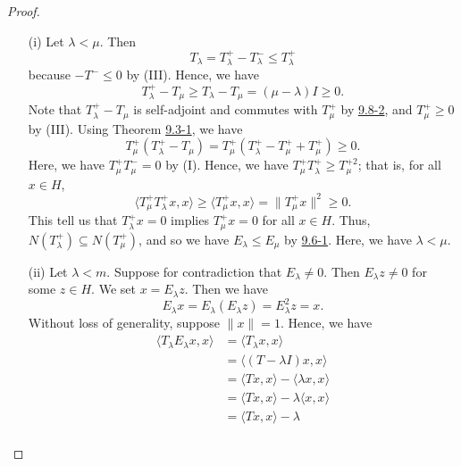\begin{proof}
\begin{enumerate}
    \item[(i)] Let \( \lambda < \mu  \). Then 
        \[  {T}_{\lambda} = {T}_{\lambda}^{+} - {T}_{\lambda}^{-} \leq {T}_{\lambda}^{+}  \] because \( -T^{-} \leq 0  \) by (III). Hence, we have  
        \[  {T}_{\lambda}^{+} - {T}_{\mu } \geq {T}_{\lambda } - {T}_{\mu  } = (\mu  - \lambda ) I \geq 0.  \] 
    Note that \( {T}_{\lambda}^{+} - {T}_{\mu  } \) is self-adjoint and commutes with \( {T}_{\mu }^{+} \) by {\hyperref[9.8-2]{9.8-2}}, and \( {T}_{\mu }^{+} \geq 0  \) by (III). Using Theorem {\hyperref[9.3-1]{9.3-1}}, we have  
    \[  {T}_{\mu }^{+} ({T}_{\lambda}^{+} - {T}_{\mu }) = {T}_{\mu }^{+} ({T}_{\lambda}^{+} - {T}_{\mu  }^{+} + {T}_{\mu }^{+}) \geq 0.  \]
    Here, we have \( {T}_{\mu }^{+} {T}_{\mu}^{-}  = 0 \) by (I). Hence, we have \( {T}_{\mu  }^{+} {T}_{\lambda}^{+} \geq {T}_{\mu }^{+2}  \); that is, for all \( x \in H  \), 
    \[  \langle {T}_{\mu  }^{+} {T}_{\lambda}^{+} x  , x  \rangle \geq \langle {T}_{\mu }^{+} x  , x  \rangle = \|{T}_{\mu }^{+} x \|^{2} \geq 0.  \]
    This tell us that \( {T}_{\lambda}^{+} x = 0  \) implies \( {T}_{\mu  }^{+} x = 0  \) for all \( x \in H  \). Thus, \( N({T}_{\lambda}^{+}) \subseteq  N({T}_{\mu }^{+}) \), and so we have \( {E}_{\lambda } \leq {E}_{\mu }  \) by {\hyperref[9.6-1]{9.6-1}}. Here, we have \( \lambda < \mu  \). 
\item[(ii)] Let \( \lambda < m  \). Suppose for contradiction that \( {E}_{\lambda} \neq 0  \). Then \( {E}_{\lambda}z \neq 0   \) for some \( z \in H  \). We set \( x = {E}_{\lambda}z  \). Then we have
    \[  {E}_{\lambda} x  = {E}_{\lambda} ({E}_{\lambda} z ) = {E}_{\lambda}^{2} z = x.    \]
    Without loss of generality, suppose \( \|x\| = 1  \). Hence, we have 
    \begin{align*}
        \langle {T}_{\lambda}{E}_{\lambda} x  ,  x  \rangle &= \langle {T}_{\lambda} x  ,  x  \rangle \\
                                                            &= \langle (T - \lambda I ) x  , x  \rangle \\
                                                            &= \langle Tx , x  \rangle - \langle \lambda x  ,  x  \rangle \\
                                                            &= \langle Tx , x  \rangle - \lambda \langle x , x  \rangle \\
                                                            &= \langle Tx , x  \rangle - \lambda  \tag{\( \|x\| = 1  \)} \\

\end{align*}
\end{enumerate}
\end{proof}
